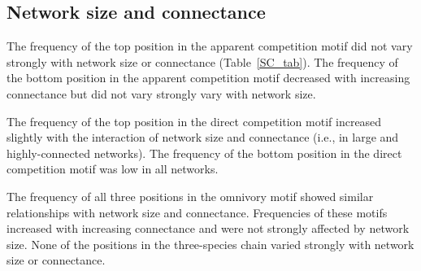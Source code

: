\documentclass[12pt]{article}
\begin{document}
\begin{spacing}{2.0}
    
        \subsection*{Network size and connectance}
    
            The frequency of the top position in the apparent competition motif did not vary strongly with network size or connectance (Table~\ref{SC_tab}).
            The frequency of the bottom position in the apparent competition motif decreased with increasing connectance but did not vary strongly vary with network size.
            
            
            The frequency of the top position in the direct competition motif increased slightly with the interaction of network size and connectance (i.e., in large and highly-connected networks).
            The frequency of the bottom position in the direct competition motif was low in all networks.
            
            
            The frequency of all three positions in the omnivory motif showed similar relationships with network size and connectance.
            Frequencies of these motifs increased with increasing connectance and were not strongly affected by network size.
            None of the positions in the three-species chain varied strongly with network size or connectance.
    

\end{spacing}
\end{document}
